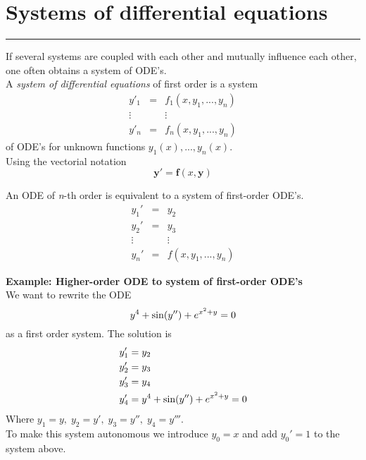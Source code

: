\section{Systems of differential equations}
\noindent\rule[\linienAbstand]{\linewidth}{\linienDickeDick}
If several systems are coupled with each other and mutually influence each other, one often obtains a system of ODE’s.\\
A \emph{system of differential equations} of first order is a system
\begin{equation}
  \begin{matrix}
    y'_1 & = & f_1(x, y_1,...,y_n)\\
    \vdots & & \vdots \;\;\;\;\; \; \; \; \; \; \; \; \; \; \; \; \; \; \\
    y'_n & = & f_n(x, y_1,...,y_n)
\end{matrix}
\end{equation}
of ODE’s for unknown functions $y_1(x), ... , y_n(x)$.\\
Using the vectorial notation
\begin{equation}
  \mathbf{y}' = \mathbf{f}(x, \mathbf{y})
\end{equation}

An ODE of \emph{n}-th order is equivalent to a system of first-order ODE's.
\begin{equation}
  \begin{matrix}
    y_1' & = & y_2\\
    y_2' & = & y_3\\
    \vdots  &  & \vdots \\
    y_n' & = & f(x, y_1, ..., y_n)
  \end{matrix}
\end{equation}

\textbf{Example: Higher-order ODE to system of first-order ODE's}\\
We want to rewrite the ODE
\begin{equation}
  y^4 + \textup{sin}(y'') + e^{x^2 + y} = 0
\end{equation}
as a first order system. The solution is
\begin{equation}
  \begin{split}
    y_1' &= y_2\\
    y_2' &= y_3\\
    y_3' &= y_4 \\
    y_4' &= y^4 + \textup{sin}(y'') + e^{x^2 + y} = 0
  \end{split}
\end{equation}
Where $y_1 = y,\; y_2 = y',\; y_3 = y'',\; y_4 = y'''$.\\
To make this system autonomous we introduce $y_0 = x$ and add $y_0' = 1$ to the system above.\\


